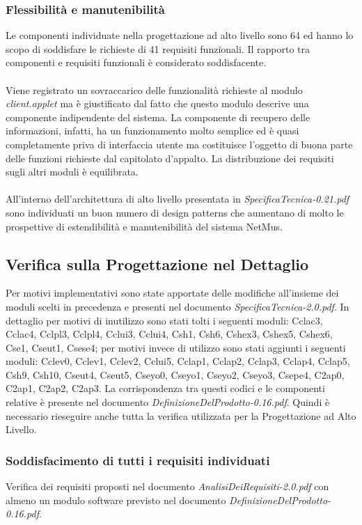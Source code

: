 \subsubsection*{Flessibilit\`a e manutenibilit\`a} 
Le componenti individuate nella
progettazione ad alto livello sono 64 ed hanno lo scopo di soddisfare le
richieste di 41 requisiti funzionali. Il rapporto tra componenti e requisiti
funzionali \`e considerato soddisfacente. \\\\ 
Viene registrato un sovraccarico delle funzionalit\`a richieste al modulo
\emph{client.applet} ma \`e giustificato dal fatto che questo modulo descrive
una componente indipendente del sistema. La componente di recupero delle
informazioni, infatti, ha un funzionamento molto semplice ed \`e quasi
completamente priva di interfaccia utente ma costituisce l'oggetto di buona
parte delle funzioni richieste dal capitolato d'appalto. La distribuzione dei
requisiti sugli altri moduli \`e equilibrata.\\\\
All'interno dell'architettura di alto livello presentata in
\emph{SpecificaTecnica-0.21.pdf} sono individuati un buon numero di design
patterns che aumentano di molto le prospettive di estendibilit\`a e
manutenibilit\`a del sistema NetMus.

\subsection{Verifica sulla Progettazione nel Dettaglio}
Per motivi implementativi sono state apportate delle modifiche all'insieme dei
moduli scelti in precedenza e presenti nel documento
\emph{SpecificaTecnica-2.0.pdf}. In dettaglio per motivi di
inutilizzo sono stati tolti i seguenti moduli: Cclac3, Cclac4, Cclpl3, Cclpl4,
Cclui3, Cclui4, Csh1, Csh6, Cshex3, Cshex5, Cshex6, Cse1, Cseut1, Csese4;
per motivi invece di utilizzo sono stati aggiunti i seguenti moduli: Cclev0,
Cclev1, Cclev2, Cclui5, Cclap1, Cclap2, Cclap3, Cclap4, Cclap5, Csh9, Csh10,
Cseut4, Cseut5, Cseyo0, Cseyo1, Cseyo2, Cseyo3, Csepe4, C2ap0, C2ap1, C2ap2,
C2ap3. La corrispondenza tra questi codici e le componenti relative \`e presente
nel documento \emph{DefinizioneDelProdotto-0.16.pdf}.
Quindi \`e necessario rieseguire anche tutta la verifica utilizzata per la
Progettazione ad Alto Livello.

\subsubsection*{Soddisfacimento di tutti i requisiti individuati}
Verifica dei requisiti proposti nel documento \emph{AnalisiDeiRequisiti-2.0.pdf}
con almeno un modulo software previsto nel documento
\emph{DefinizioneDelProdotto-0.16.pdf}.

